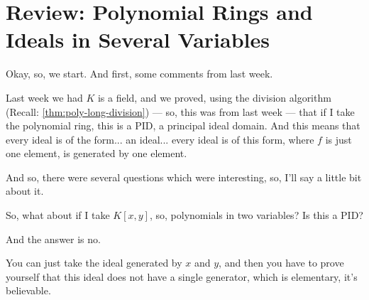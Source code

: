 \section{Review: Polynomial Rings and Ideals in Several Variables}

\begin{speech}[00:00:00 - 00:01:19]
Okay, so, we start. And first, some comments from last week.

Last week we had $K$ is a field,  and we proved, using the division algorithm (Recall: \cref{thm:poly-long-division}) --- so, this was from last week --- that if I take the polynomial ring, this is a PID,  a principal ideal domain. And this means that  every ideal  is of the form... an ideal... every ideal is of this form, where $f$ is just one element, is generated by one element.

And so, there were several questions which were interesting, so, I'll say a little bit about it.

So, what about  if I take $K[x, y]$,  so, polynomials in two variables? Is this a PID? 

And the answer is no. 

You can just take the ideal generated by $x$ and $y$,  and then you have to prove yourself that this ideal does not have a single generator, which is elementary, it's believable.
\end{speech}


